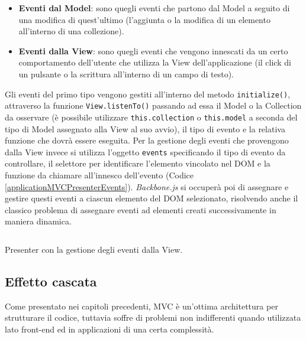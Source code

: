 \begin{itemize}
    \item \textbf{Eventi dal Model}: sono quegli eventi che partono dal Model a seguito di una modifica di quest'ultimo (l'aggiunta o la modifica di un elemento all'interno di una collezione).
    \item \textbf{Eventi dalla View}: sono quegli eventi che vengono innescati da un certo comportamento dell'utente che utilizza la View dell'applicazione (il click di un pulsante o la scrittura all'interno di un campo di testo).
\end{itemize}

Gli eventi del primo tipo vengono gestiti all'interno del metodo \texttt{initialize()}, attraverso la funzione \texttt{View.listenTo()} passando ad essa il Model o la Collection da osservare (è possibile utilizzare \texttt{this.collection} o \texttt{this.model} a seconda del tipo di Model assegnato alla View al suo avvio), il tipo di evento e la relativa funzione che dovrà essere eseguita.
Per la gestione degli eventi che provengono dalla View invece si utilizza l'oggetto \texttt{events} specificando il tipo di evento da controllare, il selettore per identificare l'elemento vincolato nel DOM e la funzione da chiamare all'innesco dell'evento (Codice \ref{applicationMVCPresenterEvents}). \textit{Backbone.js} si occuperà poi di assegnare e gestire questi eventi a ciascun elemento del DOM selezionato, risolvendo anche il classico problema di assegnare eventi ad elementi creati successivamente in maniera dinamica.

\begin{listing}[ht]
\inputminted{javascript}{sources/applicationMVCPresenterEvents.js}
\caption{Presenter con la gestione degli eventi dalla View.} 
\label{applicationMVCPresenterEvents} 
\end{listing} 

\subsection{Effetto cascata}
Come presentato nei capitoli precedenti, MVC è un'ottima architettura per strutturare il codice, tuttavia soffre di problemi non indifferenti quando utilizzata lato front-end ed in applicazioni di una certa complessità.

